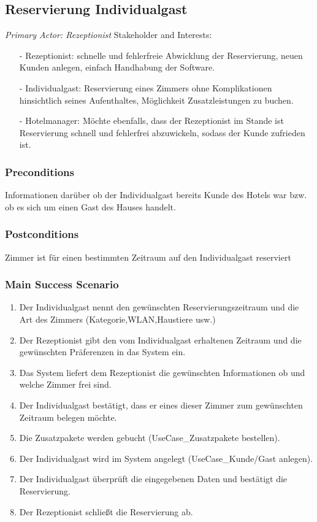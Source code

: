 \documentclass[./detailed_overview_usecases.tex]{subfiles}
\begin{document}
    \subsection{Reservierung Individualgast}


    \textit{Primary Actor: Rezeptionist}
    \newline
    Stakeholder and Interests:
    \begin{itemize}
        \item[-] Rezeptionist: schnelle und fehlerfreie Abwicklung der Reservierung, neuen Kunden anlegen, einfach Handhabung der Software.
        \item[-] Individualgast: Reservierung eines Zimmers ohne Komplikationen hinsichtlich seines Aufenthaltes, Möglichkeit Zusatzleistungen zu buchen.
        \item[-] Hotelmanager: Möchte ebenfalls, dass der Rezeptionist im Stande ist Reservierung schnell und fehlerfrei abzuwickeln, sodass der Kunde zufrieden ist.
    \end{itemize}

    \subsubsection*{Preconditions}
    Informationen darüber ob der Individualgast bereits Kunde des Hotels war bzw. ob es sich um einen Gast des Hauses handelt.

    \subsubsection*{Postconditions}
    Zimmer ist für einen bestimmten Zeitraum auf den Individualgast reserviert

    \subsubsection*{Main Success Scenario}
    \begin{enumerate}
        \item Der Individualgast nennt den gewünschten Reservierungszeitraum und die Art des Zimmers (Kategorie,WLAN,Haustiere usw.)
        \item Der Rezeptionist gibt den vom Individualgast erhaltenen Zeitraum und die gewünschten Präferenzen in das System ein.
        \item Das System liefert dem Rezeptionist die gewünschten Informationen ob und welche Zimmer frei sind.
        \item Der Individualgast bestätigt, dass er eines dieser Zimmer zum gewünschten Zeitraum belegen möchte.
        \item Die Zusatzpakete werden gebucht (UseCase_Zusatzpakete bestellen).
        \item Der Individualgast wird im System angelegt (UseCase_Kunde/Gast anlegen).
        \item Der Individualgast überprüft die eingegebenen Daten und bestätigt die Reservierung.
        \item Der Rezeptionist schließt die Reservierung ab.
    \end{enumerate}
\end{document}

